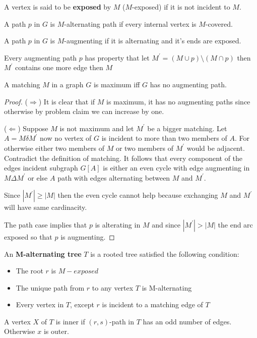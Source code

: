 			\begin{definition}[Exposed]
				A vertex is said to be \textbf{exposed} by $M$ ($M$-exposed) if it is not incident to $M$.
			\end{definition}

			\begin{definition}[M-alternating]
				A path $p$ in $G$ is $M$-alternating path if every internal vertex is $M$-covered.
			\end{definition}

			\begin{definition}[M-augmenting]
				A path $p$ in $G$ is $M$-augmenting if it is alternating and it's ends are exposed.
			\end{definition}

			\begin{lemma}
				Every augmenting path $p$ has property that let $M^\prime = (M \cup p) \setminus (M \cap p)$ then $M^\prime$ contains one more edge then $M$
			\end{lemma}

			\begin{theorem}
				A matching $M$ in a graph $G$ is maximum iff $G$ has no augmenting path.
			\end{theorem}

			\begin{proof}
				($\Rightarrow$) It is clear that if $M$ is maximum, it has no augmenting paths since otherwise by problem claim we can increase by one.

				($\Leftarrow$) Suppose $M$ is not maximum and let $M^\prime$ be a bigger matching. Let $A = M \delta M^\prime$ now no vertex of $G$ is incident to more than two members of $A$. For otherwise either two members of $M$ or two members of $M^\prime$ would be adjacent. Contradict the definition of matching. It follows that every component of the edges incident subgraph $G[A]$ is either an even cycle with edge augmenting in $M\Delta M^\prime$ or else $A$ path with edges alternating between $M$ and $M^\prime$.

				Since $|M^\prime| \ge |M|$ then the even cycle cannot help because exchanging $M$ and $M^\prime$ will have same cardinacity.

				The path case implies that $p$ is alterating in $M$ and since $|M^\prime| > |M|$ the end arc exposed so that $p$ is augmenting.
			\end{proof}

			\begin{definition}
				An \textbf{M-alternating tree} $T$ is a rooted tree satisfied the following condition:
				\begin{itemize}
					\item The root $r$ is $M-exposed$
					\item The unique path from $r$ to any vertex $T$ is M-alternating
					\item Every vertex in $T$, except $r$ is incident to a matching edge of $T$
				\end{itemize}
				A vertex $X$ of $T$ is inner if $(r, s)$-path in $T$ has an odd number of edges. Otherwise $x$ is outer.
			\end{definition}

